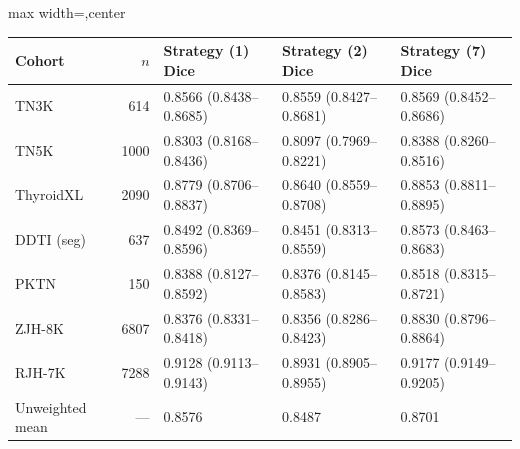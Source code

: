 
\begin{responsetable}
\caption{}
\begin{adjustbox}{max width=\textwidth,center}
\begin{tabular}{@{}l r l l l@{}}
\toprule
Cohort & $n$ & Strategy (1) Dice & Strategy (2) Dice & Strategy (7) Dice \\
\midrule
TN3K & 614 & 0.8566 (0.8438--0.8685) & 0.8559 (0.8427--0.8681) & 0.8569 (0.8452--0.8686) \\
TN5K & 1000 & 0.8303 (0.8168--0.8436) & 0.8097 (0.7969--0.8221) & 0.8388 (0.8260--0.8516) \\
ThyroidXL & 2090 & 0.8779 (0.8706--0.8837) & 0.8640 (0.8559--0.8708) & 0.8853 (0.8811--0.8895) \\
DDTI (seg) & 637 & 0.8492 (0.8369--0.8596) & 0.8451 (0.8313--0.8559) & 0.8573 (0.8463--0.8683) \\
PKTN & 150 & 0.8388 (0.8127--0.8592) & 0.8376 (0.8145--0.8583) & 0.8518 (0.8315--0.8721) \\
ZJH-8K & 6807 & 0.8376 (0.8331--0.8418) & 0.8356 (0.8286--0.8423) & 0.8830 (0.8796--0.8864) \\
RJH-7K & 7288 & 0.9128 (0.9113--0.9143) & 0.8931 (0.8905--0.8955) & 0.9177 (0.9149--0.9205) \\
\midrule
Unweighted mean & --- & 0.8576 & 0.8487 & 0.8701 \\
\bottomrule
\end{tabular}
\end{adjustbox}
\end{responsetable}

